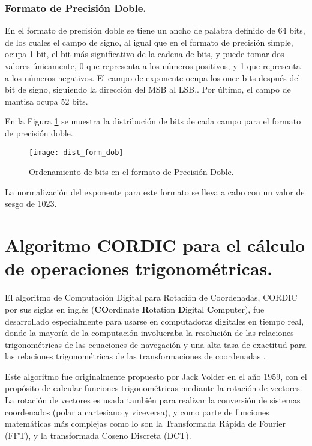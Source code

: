 \subsubsection{Formato de Precisión Doble.}

En el formato de precisión doble se tiene un ancho de palabra definido de 64 bits, de los cuales el campo de signo, al igual que en el formato de precisión simple, ocupa 1 bit, el bit más significativo de la cadena de bits, y puede tomar dos valores únicamente, 0 que representa a los números positivos, y 1 que representa a los números negativos. El campo de exponente ocupa los once bits después del bit de signo, siguiendo la dirección del MSB al LSB.. Por último, el campo de mantisa ocupa 52 bits.

En la Figura \ref{fig:dist_form_dob} se muestra la distribución de bits de cada campo para el formato de precisión doble.

\begin{figure}[htb]
  \centering
  \texttt{[image: dist\_form\_dob]}
  \caption{Ordenamiento de bits en el formato de Precisión Doble.}
  \label{fig:dist_form_dob}
\end{figure}

La normalización del exponente para este formato se lleva a cabo con un valor de sesgo de 1023.

\section{Algoritmo CORDIC para el cálculo de operaciones trigonométricas.}

El algoritmo de Computación Digital para Rotación de Coordenadas, CORDIC por sus siglas en inglés (\textbf{CO}ordinate \textbf{R}otation \textbf{D}igital \textbf{C}omputer), fue desarrollado especialmente para usarse en computadoras digitales en tiempo real, donde la mayoría de la computación involucraba la resolución de las relaciones trigonométricas de las ecuaciones de navegación y una alta tasa de exactitud para las relaciones trigonométricas de las transformaciones de coordenadas \cite{CORDIC}.

Este algoritmo fue  originalmente propuesto por Jack Volder en el año 1959, con el propósito de calcular funciones trigonométricas mediante la rotación de vectores. La rotación de vectores es usada también para realizar la conversión de sistemas coordenados (polar a cartesiano y viceversa), y como parte de funciones matemáticas más complejas como lo son la Transformada Rápida de Fourier (FFT), y la transformada Coseno Discreta (DCT).

